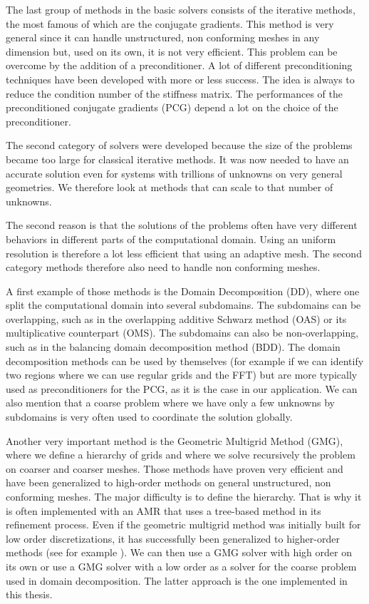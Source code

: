 The last group of methods in the basic solvers consists of the iterative methods, the most famous of which are the conjugate gradients. This method is very general since it can handle unstructured, non conforming meshes in any dimension but, used on its own, it is not very efficient. This problem can be overcome by the addition of a preconditioner. A lot of different preconditioning techniques have been developed with more or less success. The idea is always to reduce the condition number of the stiffness matrix. The performances of the preconditioned conjugate gradients (PCG) depend a lot on the choice of the preconditioner. 


The second category of solvers were developed because the size of the problems became too large for classical iterative methods. It was now needed to have an accurate solution even for systems with trillions of unknowns on very general geometries. We therefore look at methods that can scale to that number of unknowns.  

The second reason is that the solutions of the problems often have very different behaviors in different parts of the computational domain. Using an uniform resolution is therefore a lot less efficient that using an adaptive mesh. The second category methods therefore also need to handle non conforming meshes. 

A first example of those methods is the Domain Decomposition (DD), where one split the computational domain into several subdomains. The subdomains can be overlapping, such as in the overlapping additive Schwarz method (OAS) or its multiplicative counterpart (OMS). The subdomains can also be non-overlapping, such as in the balancing domain decomposition method (BDD). The domain decomposition methods can be used by themselves (for example if we can identify two regions where we can use regular grids and the FFT) but are more typically used as preconditioners for the PCG, as it is the case in our application. We can also mention that a coarse problem where we have only a few unknowns by subdomains is very often used to coordinate the solution globally. 

Another very important method is the Geometric Multigrid Method (GMG), where we define a hierarchy of grids and where we solve recursively the problem on coarser and coarser meshes. Those methods have proven very efficient and have been generalized to high-order methods on general unstructured, non conforming meshes. The major difficulty is to define the hierarchy. That is why it is often implemented with an AMR that uses a tree-based method in its refinement process. Even if the geometric multigrid method was initially built for low order discretizations, it has successfully been generalized to higher-order methods (see for example \cite{multi_high}). We can then use a GMG solver with high order on its own or use a GMG solver with a low order as a solver for the coarse problem used in domain decomposition. The latter approach is the one implemented in this thesis. 

